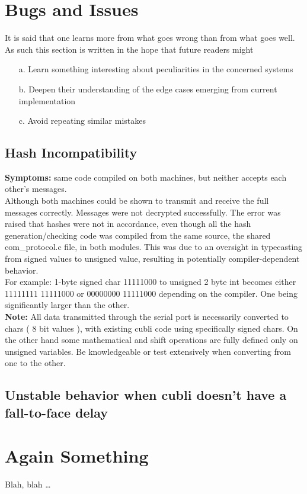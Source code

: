 \chapter{Bugs and Issues}\label{sec:bugsandissues}

It is said that one learns more from what goes wrong than from what goes well. As such this section is written in the hope that future readers might  
\begin{itemize}
\item[a.] Learn something interesting about peculiarities in the concerned systems
\item[b.] Deepen their understanding of the edge cases emerging from current implementation  
\item[c.]Avoid repeating similar mistakes 
\end{itemize}
 
\section{Hash Incompatibility}

\textbf{Symptoms:} same code compiled on both machines, but neither accepts each other's messages.\\
Although both machines could be shown to transmit and receive the full messages correctly. Messages were not decrypted successfully. The error was raised that hashes were not in accordance, even though all the hash generation/checking code was compiled from the same source, the shared com\_protocol.c file, in both modules. This was due to an oversight in typecasting from signed values to unsigned value, resulting in potentially compiler-dependent behavior. \\
For example: 1-byte signed char 11111000 to unsigned 2 byte int becomes either 11111111 11111000 or 00000000 11111000 depending on the compiler. One being significantly larger than the other.  \\
\textbf{Note:} All data transmitted through the serial port is necessarily converted to chars ( 8 bit values ), with existing cubli code using specifically signed chars. On the other hand some mathematical and shift operations are fully defined only on unsigned variables. Be knowledgeable or test extensively when converting from one to the other.  
 
\section{Unstable behavior when cubli doesn't have a fall-to-face delay} 

 \cleardoublepage


\chapter{Again Something}\label{sec:again_something}

Blah, blah \dots

 \cleardoublepage